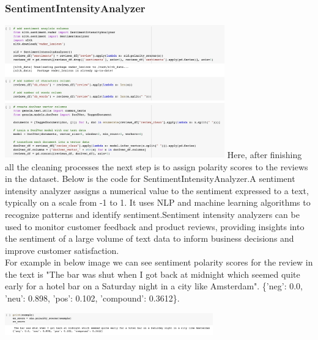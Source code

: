 \subsubsection{SentimentIntensityAnalyzer}
\includegraphics[width=9.5cm, height=12cm \textwidth]{sentiment analysis.jpeg}
Here, after finishing all the cleaning processes the next step is to assign polarity scores to the reviews in the dataset. Below is the code for SentimentIntensityAnalyzer.A sentiment intensity analyzer assigns a numerical value to the sentiment expressed to a text, typically on a scale from -1 to 1. It uses NLP and machine learning algorithms to recognize patterns and identify sentiment.Sentiment intensity analyzers can be used to monitor customer feedback and product reviews, providing insights into the sentiment of a large volume of text data to inform business decisions and improve customer satisfaction.\\

For example in below image we can see sentiment polarity scores for the review in the text is "The bar was shut when I got back at midnight which seemed quite early for a hotel bar on a Saturday night in a city like Amsterdam". \{'neg': 0.0, 'neu': 0.898, 'pos': 0.102, 'compound': 0.3612\}.

\includegraphics[width=9cm, height=2.75cm \textwidth]{sia pol.jpeg}

